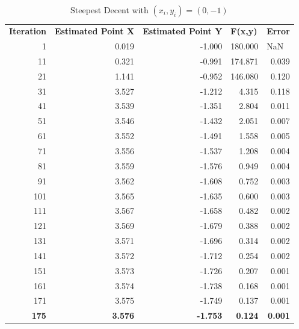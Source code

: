 \documentclass[12pt]{article}
\begin{document}
\begin{table}[h!]
  \centering
  \caption{Steepest Decent with $(x_i,y_i) = (0,-1)$}
    \begin{tabular}{rrrrr}
    \multicolumn{1}{l}{\textbf{Iteration}} & \multicolumn{1}{l}{\textbf{Estimated Point X}} & \multicolumn{1}{l}{\textbf{Estimated Point Y}} & \multicolumn{1}{l}{\textbf{F(x,y)}} & \multicolumn{1}{l}{\textbf{Error}} \\
    1     & 0.019 & -1.000 & 180.000 & \multicolumn{1}{l}{NaN} \\
    11    & 0.321 & -0.991 & 174.871 & 0.039 \\
    21    & 1.141 & -0.952 & 146.080 & 0.120 \\
    31    & 3.527 & -1.212 & 4.315 & 0.118 \\
    41    & 3.539 & -1.351 & 2.804 & 0.011 \\
    51    & 3.546 & -1.432 & 2.051 & 0.007 \\
    61    & 3.552 & -1.491 & 1.558 & 0.005 \\
    71    & 3.556 & -1.537 & 1.208 & 0.004 \\
    81    & 3.559 & -1.576 & 0.949 & 0.004 \\
    91    & 3.562 & -1.608 & 0.752 & 0.003 \\
    101   & 3.565 & -1.635 & 0.600 & 0.003 \\
    111   & 3.567 & -1.658 & 0.482 & 0.002 \\
    121   & 3.569 & -1.679 & 0.388 & 0.002 \\
    131   & 3.571 & -1.696 & 0.314 & 0.002 \\
    141   & 3.572 & -1.712 & 0.254 & 0.002 \\
    151   & 3.573 & -1.726 & 0.207 & 0.001 \\
    161   & 3.574 & -1.738 & 0.168 & 0.001 \\
    171   & 3.575 & -1.749 & 0.137 & 0.001 \\
    \textbf{175} & \textbf{3.576} & \textbf{-1.753} & \textbf{0.124} & \textbf{0.001} \\
    \end{tabular}%
  \label{tab:SDM_guess3}%
\end{table}%
\end{document}
